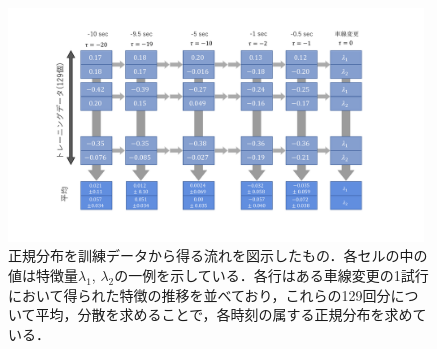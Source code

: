 \begin{figure}[htbp]
  \centering
    \includegraphics[width=11cm,keepaspectratio]{fig/training_flow.pdf}
  \caption{正規分布を訓練データから得る流れを図示したもの．各セルの中の値は特徴量$\lambda_1$, $\lambda_2$の一例を示している．各行はある車線変更の1試行において得られた特徴の推移を並べており，これらの129回分について平均，分散を求めることで，各時刻の属する正規分布を求めている．}
  \label{fig:training_flow}
\end{figure}
